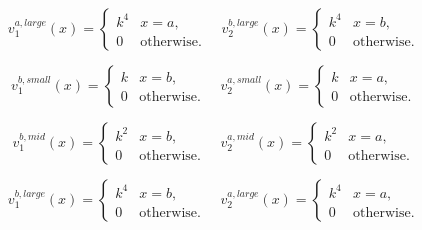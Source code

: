 \[
v_1^{{a,large}}(x) = 
\begin{cases}
k^4 & x=a,\\
0 & \text{otherwise.}
\end{cases} \quad 
v_2^{{b,large}}(x) = 
\begin{cases}
k^4 & x=b,\\
0 & \text{otherwise.}
\end{cases}
\]

\[
v_1^{{b,small}}(x) = 
\begin{cases}
k & x=b,\\
0 & \text{otherwise.}
\end{cases} \quad 
v_2^{{a,small}}(x) = 
\begin{cases}
k & x=a,\\
0 & \text{otherwise.}
\end{cases}
\]

\[
v_1^{{b,mid}}(x) = 
\begin{cases}
k^2 & x=b,\\
0 & \text{otherwise.}
\end{cases} \quad 
v_2^{{a,mid}}(x) = 
\begin{cases}
k^2 & x=a,\\
0 & \text{otherwise.}
\end{cases}
\]

\[
v_1^{{b,large}}(x) = 
\begin{cases}
k^4 & x=b,\\
0 & \text{otherwise.}
\end{cases} \quad 
v_2^{{a,large}}(x) = 
\begin{cases}
k^4 & x=a,\\
0 & \text{otherwise.}
\end{cases}
\]


